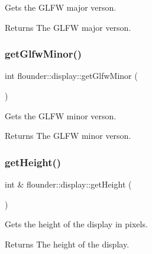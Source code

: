 Gets the G\+L\+FW major verson. 

\begin{DoxyReturn}{Returns}
The G\+L\+FW major verson. 
\end{DoxyReturn}
\mbox{\label{classflounder_1_1display_ac6fbd123308dce6a0d8f281a9ea55b37}} 
\subsubsection{\texorpdfstring{get\+Glfw\+Minor()}{getGlfwMinor()}}
{\footnotesize\ttfamily int flounder\+::display\+::get\+Glfw\+Minor (\begin{DoxyParamCaption}{ }\end{DoxyParamCaption})\hspace{0.3cm}{\ttfamily [inline]}}



Gets the G\+L\+FW minor verson. 

\begin{DoxyReturn}{Returns}
The G\+L\+FW minor verson. 
\end{DoxyReturn}
\mbox{\label{classflounder_1_1display_a2b3cea6e41121de9d790acf027036167}} 
\subsubsection{\texorpdfstring{get\+Height()}{getHeight()}}
{\footnotesize\ttfamily int \& flounder\+::display\+::get\+Height (\begin{DoxyParamCaption}{ }\end{DoxyParamCaption})}



Gets the height of the display in pixels. 

\begin{DoxyReturn}{Returns}
The height of the display. 
\end{DoxyReturn}
\mbox{\label{classflounder_1_1display_a3f1438e0d64121ae94e3e1f1931dc09a}} 
